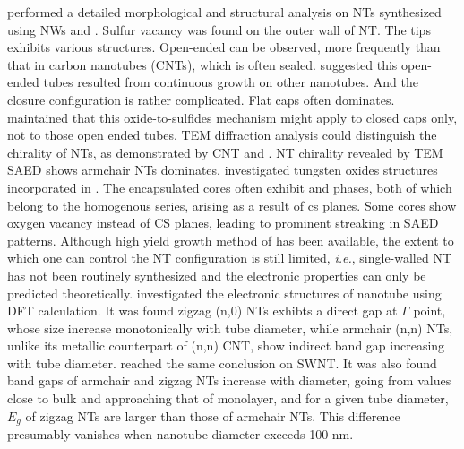 \citeauthor{Zhu2000} performed a detailed morphological and structural analysis on  NTs synthesized using  NWs and .\cite{Zhu2000} Sulfur vacancy was found on the outer wall of NT. The tips exhibits various structures. Open-ended can be observed, more frequently than that in carbon nanotubes (CNTs), which is often sealed. \citeauthor{Zhu2000} suggested this open-ended tubes resulted from continuous growth on other nanotubes. And the closure configuration is rather complicated. Flat caps often dominates. \citeauthor{Zhu2000} maintained that this oxide-to-sulfides mechanism might apply to closed caps only, not to those open ended tubes.\cite{Zhu2000} TEM diffraction analysis could distinguish the chirality of NTs, as demonstrated by CNT \cite{Zhang1993} and \cite{MARGULIS1996}.  NT chirality revealed by TEM SAED shows armchair NTs dominates. \citeauthor{Sloan1999} investigated tungsten oxides structures incorporated in .\cite{Sloan1999} The encapsulated  cores often exhibit  and  phases, both of which belong to the  homogenous series, arising as a result of \gls{cs} planes.\cite{Miyano} Some  cores show oxygen vacancy instead of CS planes, leading to prominent streaking in SAED patterns. Although high yield growth method of  has been available, the extent to which one can control the NT configuration is still limited, \emph{i.e.}, single-walled NT has not been routinely synthesized and the electronic properties can only be predicted theoretically. \citeauthor{Seifert2000} investigated the electronic structures of  nanotube using DFT calculation.\cite{Seifert2000} It was found zigzag (n,0) NTs exhibts a direct gap at $\Gamma$ point, whose size increase monotonically with tube diameter, while armchair (n,n) NTs, unlike its metallic counterpart of (n,n) CNT, show indirect band gap increasing with tube diameter. \citeauthor{Zibouche2012} reached the same conclusion on  SWNT.\cite{Zibouche2012} It was also found band gaps of armchair and zigzag NTs increase with diameter, going from values close to bulk and approaching that of  monolayer, and for a given tube diameter, $E_g$ of zigzag NTs are larger than those of armchair NTs. This difference presumably vanishes when nanotube diameter exceeds 100 nm.

